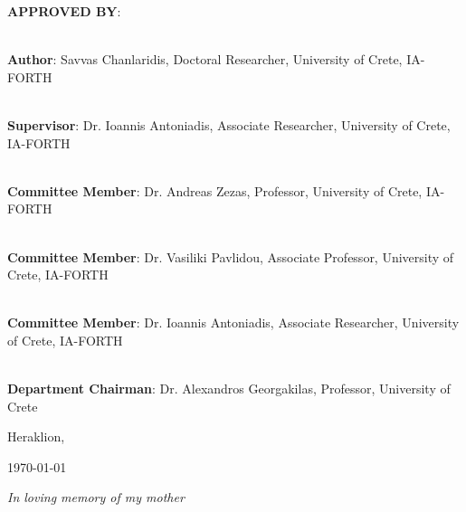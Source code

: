 \documentclass[a4paper, 10pt, twoside]{book}
\newenvironment{dedication}
  {\clearpage
   \thispagestyle{empty}
   \vspace*{\stretch{1}}
   \itshape
   \raggedleft}
  {\par
   \vspace{\stretch{3}}
   \clearpage}
\begin{document}
    \noindent \textbf{APPROVED BY}:\\
    \vspace*{1.5cm}
    
    \noindent\hrulefill \\
    \noindent\textbf{Author}: Savvas Chanlaridis, Doctoral Researcher, University of Crete, IA-FORTH \\
    \vspace*{1cm}
    
    \noindent\hrulefill \\
    \noindent\textbf{Supervisor}: Dr. Ioannis Antoniadis, Associate Researcher, University of Crete, IA-FORTH \\
    \vspace*{1cm}    
    
    \noindent\hrulefill \\
    \noindent\textbf{Committee Member}: Dr. Andreas Zezas, Professor, University of Crete, IA-FORTH \\
    \vspace*{1cm}    
    
    \noindent\hrulefill \\
    \noindent\textbf{Committee Member}: Dr. Vasiliki Pavlidou, Associate Professor, University of Crete, IA-FORTH \\
    \vspace*{1cm}    
    
    \noindent\hrulefill \\
    \noindent\textbf{Committee Member}: Dr. Ioannis Antoniadis, Associate Researcher, University of Crete, IA-FORTH \\
    \vspace*{1cm}    
    
    \noindent\hrulefill \\
    \noindent\textbf{Department Chairman}: Dr. Alexandros Georgakilas, Professor, University of Crete \\
    \vspace*{1cm}  
    
    \begin{center}
        \vspace*{\fill}
        Heraklion, \date{}{\today}
    \end{center}

    \newpage  %
    \mbox{}
    \thispagestyle{empty}

    \begin{dedication}
        In loving memory of my mother
    \end{dedication}
\end{document}
